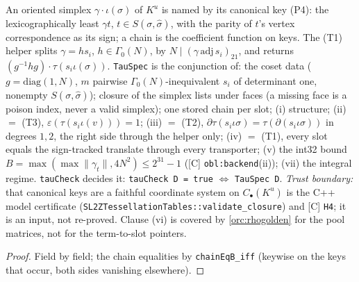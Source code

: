 \begin{definition}\label{chk:tau}
  \leanok
  An oriented simplex $\gamma\cdot\iota(\sigma)$ of $K^u$ is named by its canonical key (P4): the lexicographically least
  $\gamma t$, $t\in S(\sigma,\hat\sigma)$, with the parity of $t$'s vertex correspondence as its sign; a chain is the
  coefficient function on keys. The (T1) helper splits $\gamma=hs_i$, $h\in\Gamma_0(N)$, by $N\mid(\gamma\,\mathrm{adj}\,s_i)_{21}$,
  and returns $(g^{-1}hg)\cdot\tau(s_i\iota(\sigma))$. \texttt{TauSpec} is the conjunction of: the coset data
  ($g=\mathrm{diag}(1,N)$, $m$ pairwise $\Gamma_0(N)$-inequivalent $s_i$ of determinant one, nonempty $S(\sigma,\hat\sigma)$);
  closure of the simplex lists under faces (a missing face is a poison index, never a valid simplex); one stored chain per slot; (i) structure; (ii) $=$ (T3), $\varepsilon(\tau(s_i\iota(v)))=1$; (iii) $=$ (T2),
  $\partial\tau(s_i\iota\sigma)=\tau(\partial(s_i\iota\sigma))$ in degrees $1,2$, the right side through the helper only;
  (iv) $=$ (T1), every slot equals the sign-tracked translate through every transporter; (v) the int32 bound
  $B=\max(\max\|\gamma_t\|,4N^2)\le2^{31}-1$ ([C] \texttt{obl:backend}(ii)); (vii) the
  integral regime. \texttt{tauCheck} decides it: \texttt{tauCheck D = true} $\iff$ \texttt{TauSpec D}.
  \emph{Trust boundary:} that canonical keys are a faithful coordinate system on $C_\bullet(K^u)$ is the C++ model
  certificate (\texttt{SL2ZTessellationTables::validate\_closure}) and [C] \texttt{H4}; it is an input, not re-proved.
  Clause (vi) is covered by \ref{orc:rhogolden} for the pool matrices, not for the term-to-slot pointers.
\end{definition}
\begin{proof}
  \leanok
  Field by field; the chain equalities by \texttt{chainEqB\_iff} (keywise on the keys that occur, both sides vanishing
  elsewhere).
\end{proof}

